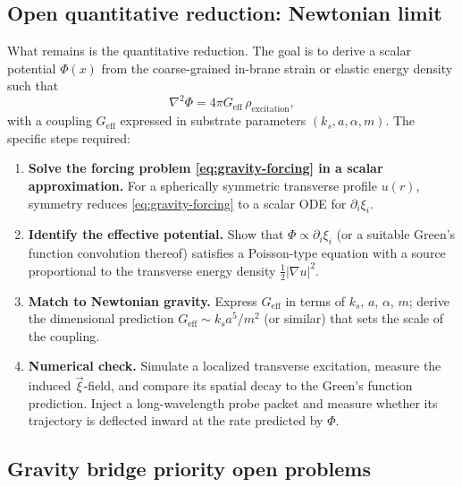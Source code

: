 \subsection{Open quantitative reduction: Newtonian limit}
\label{subsec:gravity-open-reduction}

What remains is the quantitative reduction.
The goal is to derive a scalar potential $\Phi(x)$ from the coarse-grained in-brane strain or
elastic energy density such that
\begin{equation}
  \nabla^2 \Phi = 4\pi G_{\text{eff}}\,\rho_{\text{excitation}},
  \label{eq:gravity-poisson-target}
\end{equation}
with a coupling $G_{\text{eff}}$ expressed in substrate parameters $(k_s, a, \alpha, m)$.
The specific steps required:

\begin{enumerate}
  \item \textbf{Solve the forcing problem \eqref{eq:gravity-forcing} in a scalar approximation.}
  For a spherically symmetric transverse profile $u(r)$, symmetry reduces
  \eqref{eq:gravity-forcing} to a scalar ODE for $\partial_i\xi_i$.

  \item \textbf{Identify the effective potential.}
  Show that $\Phi \propto \partial_i\xi_i$ (or a suitable Green's function convolution thereof)
  satisfies a Poisson-type equation with a source proportional to the transverse energy density
  $\tfrac12|\nabla u|^2$.

  \item \textbf{Match to Newtonian gravity.}
  Express $G_{\text{eff}}$ in terms of $k_s$, $a$, $\alpha$, $m$; derive the dimensional
  prediction $G_{\text{eff}} \sim k_s a^5 / m^2$ (or similar) that sets the scale of the
  coupling.

  \item \textbf{Numerical check.}
  Simulate a localized transverse excitation, measure the induced $\vec\xi$-field, and compare
  its spatial decay to the Green's function prediction.
  Inject a long-wavelength probe packet and measure whether its trajectory is deflected inward
  at the rate predicted by $\Phi$.
\end{enumerate}

\subsection{Gravity bridge priority open problems}
\label{subsec:gravity-open}

